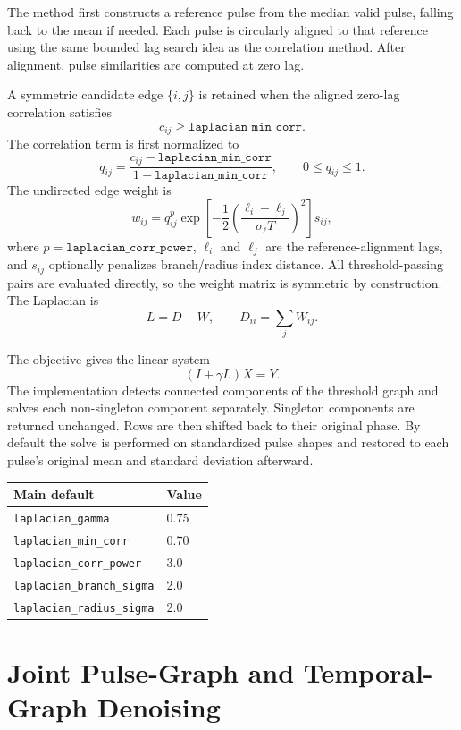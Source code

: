 \documentclass[11pt]{article}
\begin{document}
The method first constructs a reference pulse from the median valid pulse,
falling back to the mean if needed.  Each pulse is circularly aligned to that
reference using the same bounded lag search idea as the correlation method.
After alignment, pulse similarities are computed at zero lag.

A symmetric candidate edge \(\{i,j\}\) is retained when the aligned
zero-lag correlation satisfies
\[
    c_{ij}\geq\texttt{laplacian\_min\_corr}.
\]
The correlation term is first normalized to
\[
    q_{ij} =
    \frac{c_{ij}-\texttt{laplacian\_min\_corr}}
         {1-\texttt{laplacian\_min\_corr}},
    \qquad 0\leq q_{ij}\leq 1.
\]
The undirected edge weight is
\[
    w_{ij}
    =
    q_{ij}^p
    \exp\left[-\frac{1}{2}
        \left(\frac{\ell_i-\ell_j}{\sigma_{\ell}T}\right)^2\right]
    s_{ij},
\]
where \(p=\texttt{laplacian\_corr\_power}\), \(\ell_i\) and \(\ell_j\) are
the reference-alignment lags, and \(s_{ij}\) optionally penalizes branch/radius
index distance.  All threshold-passing pairs are evaluated directly, so the
weight matrix is symmetric by construction.  The Laplacian is
\[
    L=D-W,\qquad D_{ii}=\sum_j W_{ij}.
\]

The objective gives the linear system
\[
    (I+\gamma L)X=Y.
\]
The implementation detects connected components of the threshold graph and
solves each non-singleton component separately.  Singleton components are
returned unchanged.  Rows are then shifted back to their original phase.  By
default the solve is performed on standardized pulse shapes and restored to
each pulse's original mean and standard deviation afterward.

\begin{tabular}{@{}ll@{}}
\toprule
Main default & Value \\
\midrule
\texttt{laplacian\_gamma} & 0.75 \\
\texttt{laplacian\_min\_corr} & 0.70 \\
\texttt{laplacian\_corr\_power} & 3.0 \\
\texttt{laplacian\_branch\_sigma} & 2.0 \\
\texttt{laplacian\_radius\_sigma} & 2.0 \\
\bottomrule
\end{tabular}

\section{Joint Pulse-Graph and Temporal-Graph Denoising}
\end{document}
